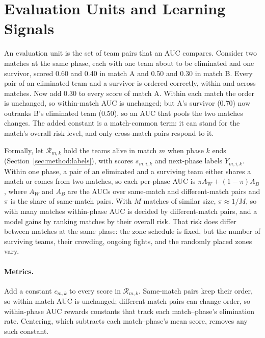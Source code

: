\documentclass[sigconf,anonymous]{acmart}
\begin{document}
\section{Evaluation Units and Learning Signals}
\label{sec:account}
An evaluation unit is the set of team pairs that an AUC compares. Consider two matches at the same phase, each with one team about to be eliminated and one survivor, scored 0.60 and 0.40 in match A and 0.50 and 0.30 in match B. Every pair of an eliminated team and a survivor is ordered correctly, within and across matches. Now add 0.30 to every score of match A. Within each match the order is unchanged, so within-match AUC is unchanged; but A's survivor (0.70) now outranks B's eliminated team (0.50), so an AUC that pools the two matches changes. The added constant is a match-common term: it can stand for the match's overall risk level, and only cross-match pairs respond to it.

Formally, let $\mathcal{R}_{m,k}$ hold the teams alive in match $m$ when phase $k$ ends (Section~\ref{sec:method:labels}), with scores $s_{m,i,k}$ and next-phase labels $Y_{m,i,k}$. Within one phase, a pair of an eliminated and a surviving team either shares a match or comes from two matches, so each per-phase AUC is $\pi A_W+(1-\pi)A_B$, where $A_W$ and $A_B$ are the AUCs over same-match and different-match pairs and $\pi$ is the share of same-match pairs. With $M$ matches of similar size, $\pi\approx1/M$, so with many matches within-phase AUC is decided by different-match pairs, and a model gains by ranking matches by their overall risk. That risk does differ between matches at the same phase: the zone schedule is fixed, but the number of surviving teams, their crowding, ongoing fights, and the randomly placed zones vary.

\paragraph{Metrics.}
Add a constant $c_{m,k}$ to every score in $\mathcal{R}_{m,k}$. Same-match pairs keep their order, so within-match AUC is unchanged; different-match pairs can change order, so within-phase AUC rewards constants that track each match--phase's elimination rate. Centering, which subtracts each match--phase's mean score, removes any such constant.
\end{document}
